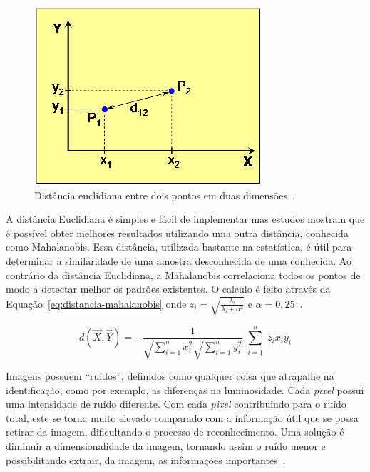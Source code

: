    \begin{figure}[H]
		\begin{center}
			\includegraphics[scale=1.0]{figuras/2.FundamentacaoTeorica/graficoDistanciaEntrePontos.png}
		\end{center}
		\caption{Distância euclidiana entre dois pontos em duas dimensões~\cite{hewitt}.}
		\label{distanciaEntrePontos}
	\end{figure}

	A distância Euclidiana é simples e fácil de implementar mas estudos mostram que
	é possível obter melhores resultados utilizando uma outra distância, conhecida
	como Mahalanobis. Essa distância, utilizada bastante na estatística, é útil
	para determinar a similaridade de uma amostra desconhecida de uma conhecida. Ao
	contrário da distância Euclidiana, a Mahalanobis correlaciona todos os pontos de
	modo a detectar melhor os padrões existentes. O calculo é feito através da
	Equação~\ref{eq:distancia-mahalanobis} onde
	$\displaystyle z_i = \sqrt{\frac{\lambda_i}{\lambda_i + \alpha^2}}$ e
	$\displaystyle \alpha = 0,25$~\cite{perlibakas}.
	
	\begin{equation}
		\label{eq:distancia-mahalanobis}
		d(\vec{X}, \vec{Y}) =  - \frac{1}{\sqrt{\sum_{i=1}^{n} x_i^2}
		\sqrt{\sum_{i=1}^{n} y_i^2}}   \sum_{\substack{i=1}}^{n} z_ix_iy_i
	\end{equation}
	
	Imagens possuem ``ruídos'', definidos como qualquer coisa que
	atrapalhe na identificação, como por exemplo, as diferenças na luminosidade.
	Cada \textit{pixel} possui uma intensidade de ruído diferente. Com cada
	\textit{pixel} contribuindo para o ruído total, este se torna muito elevado
	comparado com a informação útil que se possa retirar da imagem, dificultando o
	processo de reconhecimento. Uma solução é diminuir a dimensionalidade da imagem,
	tornando assim o ruído menor e possibilitando extrair, da imagem, as informações
	importantes~\cite{hewitt}.
		
